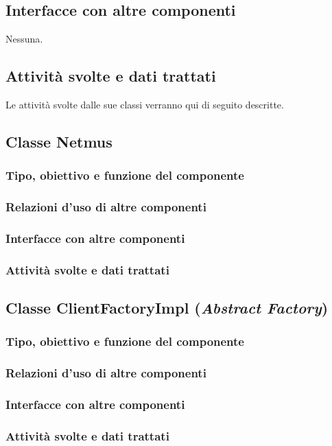 \subsection*{Interfacce con altre componenti}
Nessuna.

\subsection*{Attivit\`a svolte e dati trattati}
Le attivit\`a svolte dalle sue classi verranno qui di seguito descritte.

\subsection{Classe Netmus}
\subsubsection*{Tipo, obiettivo e funzione del componente}
\subsubsection*{Relazioni d'uso di altre componenti}
\subsubsection*{Interfacce con altre componenti}
\subsubsection*{Attivit\`a svolte e dati trattati}

\subsection{Classe ClientFactoryImpl (\emph{Abstract Factory})}
\subsubsection*{Tipo, obiettivo e funzione del componente}
\subsubsection*{Relazioni d'uso di altre componenti}
\subsubsection*{Interfacce con altre componenti}
\subsubsection*{Attivit\`a svolte e dati trattati}

